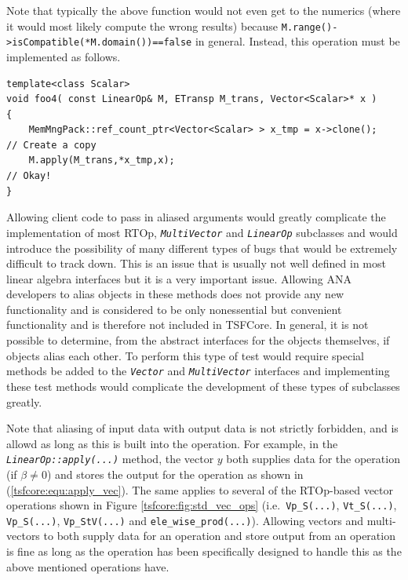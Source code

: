 \noindent Note that typically the above function would not even get to the numerics
(where it would most likely compute the wrong results) because
\texttt{M.range()->isCompatible(*M.domain())==false} in general.
Instead, this operation must be implemented as follows.

{\scriptsize\begin{verbatim}
template<class Scalar>
void foo4( const LinearOp& M, ETransp M_trans, Vector<Scalar>* x )
{
    MemMngPack::ref_count_ptr<Vector<Scalar> > x_tmp = x->clone();   // Create a copy
    M.apply(M_trans,*x_tmp,x);                                       // Okay!
}
\end{verbatim}}

\noindent Allowing client code to pass in aliased arguments would greatly
complicate the implementation of most RTOp,
\texttt{\textit{Multi\-Vector}} and \texttt{\textit{LinearOp}}
subclasses and would introduce the possibility of many different types
of bugs that would be extremely difficult to track down.  This is an
issue that is usually not well defined in most linear algebra
interfaces but it is a very important issue.  Allowing ANA developers
to alias objects in these methods does not provide any new
functionality and is considered to be only nonessential but convenient
functionality and is therefore not included in TSFCore.  In general,
it is not possible to determine, from the abstract interfaces for the
objects themselves, if objects alias each other.  To perform this type
of test would require special methods be added to the
\texttt{\textit{Vector}} and
\texttt{\textit{Multi\-Vector}} interfaces and implementing these test
methods would complicate the development of these types of subclasses
greatly.

Note that aliasing of input data with output data is not strictly
forbidden, and is allowd as long as this is built into the operation.
For example, in the \texttt{\textit{LinearOp\-::apply(\-...)}} method,
the vector $y$ both supplies data for the operation (if $\beta \ne 0$)
and stores the output for the operation as shown in
(\ref{tsfcore:equ:apply_vec}).  The same applies to several of the
RTOp-based vector operations shown in Figure
\ref{tsfcore:fig:std_vec_ops} (i.e.~\texttt{Vp\_S(...)},
\texttt{Vt\_S(...)}, \texttt{Vp\_S(...)}, \texttt{Vp\_StV(...)}
and \texttt{ele\_wise\_prod(...)}).  Allowing vectors and
multi-vectors to both supply data for an operation and store output
from an operation is fine as long as the operation has been
specifically designed to handle this as the above mentioned operations
have.

